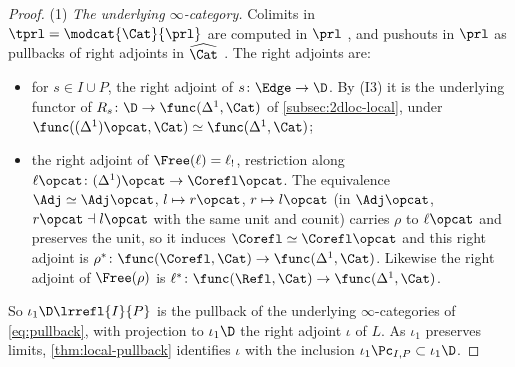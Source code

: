 \begin{proof}
(1) \emph{The underlying $\infty$-category.}
Colimits in $\tprl = \modcat{\Cat}{\prl}$ are computed in $\prl$ \cite[4.2.3.5]{ha}, and pushouts in $\prl$ as pullbacks of right adjoints in $\widehat{\Cat}$ \cite[5.5.3.4, 5.5.3.18]{htt}. The right adjoints are:
\begin{itemize}
\item for $s \in I \cup P$, the right adjoint of $s\colon \Edge \to \D$. By (I3) it is the underlying functor of $R_{s}\colon \D \to \func(\Delta^{1},\Cat)$ of \cref{subsec:2dloc-local}, under $\func((\Delta^{1})\opcat,\Cat) \simeq \func(\Delta^{1},\Cat)$;
\item the right adjoint of $\Free(\ell) = \ell_{!}$, restriction along $\ell\opcat\colon (\Delta^{1})\opcat \to \Corefl\opcat$. The equivalence $\Adj \simeq \Adj\opcat$, $l \mapsto r\opcat$, $r \mapsto l\opcat$ (in $\Adj\opcat$, $r\opcat \dashv l\opcat$ with the same unit and counit) carries $\rho$ to $\ell\opcat$ and preserves the unit, so it induces $\Corefl \simeq \Corefl\opcat$ and this right adjoint is $\rho^{*}\colon \func(\Corefl,\Cat) \to \func(\Delta^{1},\Cat)$. Likewise the right adjoint of $\Free(\rho)$ is $\ell^{*}\colon \func(\Refl,\Cat) \to \func(\Delta^{1},\Cat)$.
\end{itemize}
So $\iota_{1}\D\lrrefl{I}{P}$ is the pullback of the underlying $\infty$-categories of \eqref{eq:pullback}, with projection to $\iota_{1}\D$ the right adjoint $\iota$ of $L$. As $\iota_{1}$ preserves limits, \cref{thm:local-pullback} identifies $\iota$ with the inclusion $\iota_{1}\Pc_{I,P} \subset \iota_{1}\D$.


\end{proof}
